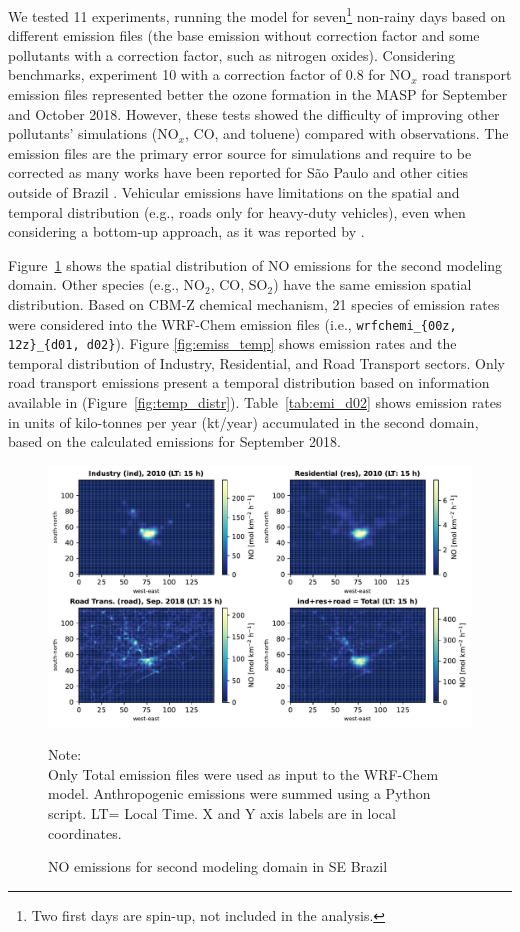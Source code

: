    We tested 11 experiments, running the model for seven\footnote{Two first days are spin-up, not included in the analysis.} non-rainy days based on different emission files (the base emission without correction factor and some pollutants with a correction factor, such as nitrogen oxides).
   Considering \citet{Emery2017} benchmarks, experiment 10 with a correction factor of 0.8 for NO$_x$ road transport emission files represented better the ozone formation in the MASP for September and October 2018.
   However, these tests showed the difficulty of improving other pollutants' simulations (NO$_x$, CO, and toluene) compared with observations. 
   The emission files are the primary error source for simulations and require to be corrected as many works have been reported for S\~{a}o Paulo and other cities outside of Brazil \citep{Russell2000, Holnicki2015, Andrade2017, Ibarra2020}.
   Vehicular emissions have limitations on the spatial and temporal distribution (e.g., roads only for heavy-duty vehicles), even when considering a bottom-up approach, as it was reported by \citet{Andrade2015}.
   
	Figure~\ref{fig:anth_dist} shows the spatial distribution of NO emissions for the second modeling domain.
	Other species (e.g., NO$_2$, CO, SO$_2$) have the same emission spatial distribution.
	Based on CBM-Z chemical mechanism, 21  species of emission rates were considered into the WRF-Chem emission files (i.e., \verb|wrfchemi_{00z, 12z}_{d01, d02}|).
	Figure \ref{fig:emiss_temp} shows emission rates and the temporal distribution of Industry, Residential, and Road Transport sectors. 
	Only road transport emissions present a temporal distribution based on information available in \citet{Andrade2015} (Figure~\ref{fig:temp_distr}).
	Table~\ref{tab:emi_d02} shows emission rates in units of kilo-tonnes per year (kt/year) accumulated in the second domain, based on the calculated emissions for September 2018.
	
	\begin{figure}[htb]
		\begin{center}
			\includegraphics[width=.9\textwidth]{fig/E_NO_emi_d02.pdf}
		\end{center}
  		\caption{NO emissions for second modeling domain in SE Brazil}
  		{\scriptsize Note:\\ Only Total emission files were used as input to the WRF-Chem model. Anthropogenic emissions were summed using a Python script. LT= Local Time. X and Y axis labels are in  local coordinates.}
  		\label{fig:anth_dist}
	\end{figure}
	
